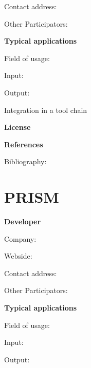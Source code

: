 \documentclass{./template/openetcs2}
\begin{document}
	Contact address:

	Other  Participators:



	\textbf{Typical applications}

	Field of usage:


	Input:

	Output:





	Integration in a tool chain



	\textbf{License}


	\textbf{References}

	Bibliography:


\section{PRISM}
	\textbf{Developer}

	Company: 

	Webside:

	Contact address:

	Other  Participators:



	\textbf{Typical applications}

	Field of usage:


	Input:

	Output:



\end{document}
